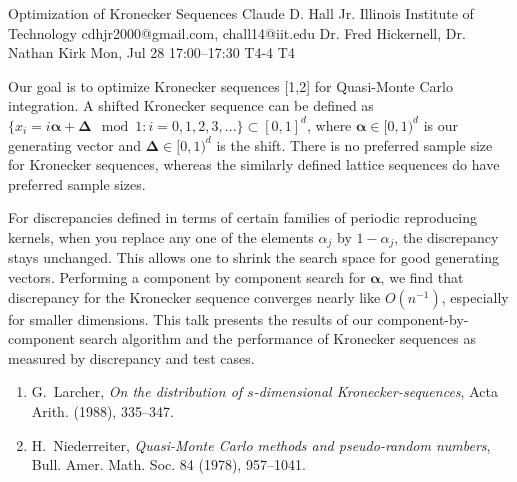\begin{talk}
  {Optimization of Kronecker Sequences}%
  {Claude D. Hall Jr.}%
  {Illinois Institute of Technology}%
  {cdhjr2000@gmail.com, chall14@iit.edu}%
  {Dr. Fred Hickernell, Dr. Nathan Kirk}%
  {}%
  {Mon, Jul 28 17:00--17:30}%
  {T4-4}%
  {T4}%
  
    

Our goal is to optimize Kronecker sequences [1,2] for Quasi-Monte Carlo integration. A shifted Kronecker sequence can be defined as $\{ x_i = i \boldsymbol{\alpha} + \boldsymbol{\Delta} \mod 1: i = 0, 1, 2, 3, ... \} \subset [0,1]^d $, where  $\boldsymbol{\alpha} \in [0,1)^d$ is our generating vector and $\boldsymbol{\Delta} \in [0,1)^d$ is the shift. There is no preferred sample size for Kronecker sequences, whereas the similarly defined lattice sequences do have preferred sample sizes. 

For discrepancies defined in terms of certain families of periodic reproducing kernels, when you replace any one of the elements $\alpha_j$ by $1 - \alpha_j$, the discrepancy stays unchanged. This allows one to shrink the search space for good generating vectors.  Performing a component by component search for $\boldsymbol{\alpha}$, we find that discrepancy for the Kronecker sequence converges nearly like $O(n^{-1})$, especially for smaller dimensions.  This talk presents the results of our component-by-component search algorithm and the performance of Kronecker sequences as measured by discrepancy and test cases.

\medskip

\begin{enumerate}
 \item[{[1]}] G.~Larcher, \emph{On the distribution of $s$-dimensional {K}ronecker-sequences}, Acta Arith. (1988), 335--347.
 \item[{[2]}] H.~Niederreiter, \emph{Quasi-Monte Carlo methods and pseudo-random numbers}, Bull. Amer. Math. Soc. 84 (1978), 957--1041.
\end{enumerate}
\end{talk}

